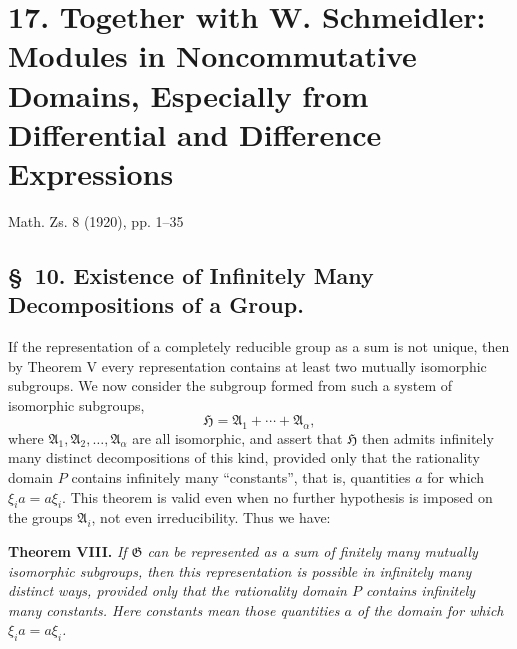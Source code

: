 \documentclass[11pt]{article}
\begin{document}
\section*{17. Together with W. Schmeidler: Modules in Noncommutative Domains, Especially from Differential and Difference Expressions}
\begin{center}
Math. Zs. 8 (1920), pp. 1--35
\end{center}

\setcounter{footnote}{19}
\subsection*{\S~10. Existence of Infinitely Many Decompositions of a Group.}

If the representation of a completely reducible group as a sum is not unique, then by Theorem V every representation contains at least two mutually isomorphic subgroups. We now consider the subgroup formed from such a system of isomorphic subgroups,
\[
  \mathfrak H=\mathfrak A_1+\cdots+\mathfrak A_\alpha,
\]
where $\mathfrak A_1,\mathfrak A_2,
\ldots,
\mathfrak A_\alpha$ are all isomorphic, and assert that $\mathfrak H$ then admits infinitely many distinct decompositions of this kind, provided only that the rationality domain $P$ contains infinitely many ``constants'', that is, quantities $a$ for which $\xi_i a=a\xi_i$. This theorem is valid even when no further hypothesis is imposed on the groups $\mathfrak A_i$, not even irreducibility. Thus we have:

\textbf{Theorem VIII.} \emph{If $\mathfrak G$ can be represented as a sum of finitely many mutually isomorphic subgroups, then this representation is possible in infinitely many distinct ways, provided only that the rationality domain $P$ contains infinitely many constants. Here constants mean those quantities $a$ of the domain for which $\xi_i a=a\xi_i$.}
\end{document}
